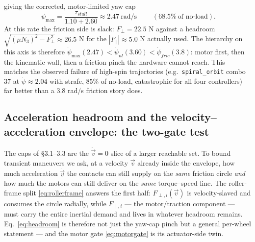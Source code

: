\documentclass[11pt]{article}
\begin{document}
giving the corrected, motor-limited yaw cap
\begin{equation}
\boxed{\;\dot\psi_{\max}=\frac{\tau_{stall}}{1.10+2.60}\approx2.47\ \text{rad/s}\;}
\qquad(68.5\%\ \text{of no-load}).
\label{eq:psicap}
\end{equation}
At this rate the friction side is slack: $F_\perp=22.5$ N against a headroom
$\sqrt{(\mu N_3)^2-F_\perp^2}\approx26.5$ N for the $|F_\parallel|\approx5.0$ N actually used.
The hierarchy on this axis is therefore
$\dot\psi_{\max}(2.47)<\dot\psi_{nl}(3.60)<\dot\psi_{fric}(3.8)$: motor first, then the
kinematic wall, then a friction pinch the hardware cannot reach. This matches the observed
failure of high-spin trajectories (e.g.\ \texttt{spiral\_orbit} combo 37 at
$\dot\psi\approx2.04$ with strafe, $85\%$ of no-load, catastrophic for all four controllers)
far better than a 3.8 rad/s friction story does.

\subsection{Acceleration headroom and the velocity--acceleration envelope: the two-gate test}
The caps of \S3.1--3.3 are the $\dot{\vec v}=0$ slice of a larger reachable set. To bound transient
maneuvers we ask, at a velocity $\vec v$ already inside the envelope, how much acceleration
$\dot{\vec v}$ the contacts can still supply on the \emph{same} friction circle \emph{and} how
much the motors can still deliver on the \emph{same} torque--speed line. The roller-frame
split \eqref{eq:rollerframe} answers the first half: $F_{\perp,i}(\vec v)$ is velocity-slaved and
consumes the circle radially, while $F_{\parallel,i}$ --- the motor/traction component --- must
carry the entire inertial demand and lives in whatever headroom remains. Eq.~\eqref{eq:headroom}
is therefore not just the yaw-cap pinch but a general per-wheel statement --- and the motor gate
\eqref{eq:motorgate} is its actuator-side twin.
\end{document}
